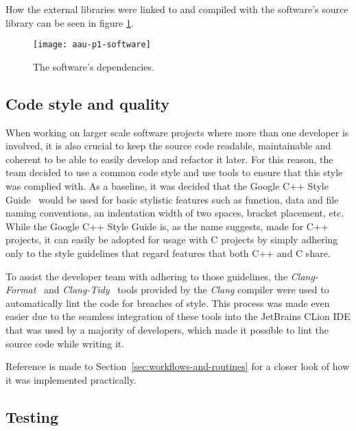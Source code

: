How the external libraries were linked to and compiled with the software's source library can be seen in figure
\ref{fig:figure10}.


\begin{figure}
    \centering
    \caption{The software's dependencies.}
    \texttt{[image: aau-p1-software]}
    \label{fig:figure10}
\end{figure}

\subsection{Code style and quality}\label{subsec:code-style-and-quality}

When working on larger scale software projects where more than one developer is involved, it is also crucial to keep the
source code readable, maintainable and coherent to be able to easily develop and refactor it later.
For this reason, the team decided to use a common code style and use tools to ensure that this style was complied with.
As a baseline, it was decided that the Google C++ Style Guide~\cite{google-style} would be used for basic stylistic
features such as function, data and file naming conventions, an indentation width of two spaces, bracket placement, etc.
While the Google C++ Style Guide is, as the name suggests, made for C++ projects, it can easily be adopted for usage
with C projects by simply adhering only to the style guidelines that regard features that both C++ and C share.

To assist the developer team with adhering to those guidelines, the \textit{Clang-Format}~\cite{clang-format} and
\textit{Clang-Tidy}~\cite{clang-tidy} tools provided by the \textit{Clang} compiler were used to automatically lint
the code for breaches of style.
This process was made even easier due to the seamless integration of these tools into the JetBrains CLion IDE that was
used by a majority of developers, which made it possible to lint the source code while writing it.


Reference is made to Section~\ref{sec:workflows-and-routines} for a closer look of how it was implemented practically.

\subsection{Testing}\label{subsec:testing}


